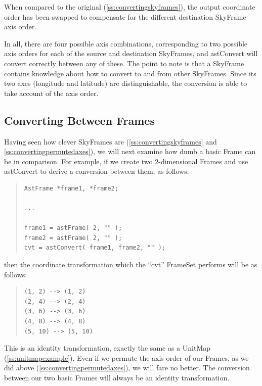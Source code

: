 \documentclass[twoside,11pt]{article}
\newcommand{\htmlref}[2]{#1}
\newcommand{\secref}[1]{\S\ref{#1}}
\renewcommand{\secref}[1]{\ref{#1}}
\begin{document}
When compared to the original (\secref{ss:convertingskyframes}), the
output coordinate order has been swapped to compensate for the
different destination SkyFrame axis order.

In all, there are four possible axis combinations, corresponding to two
possible axis orders for each of the source and destination SkyFrames,
and astConvert will convert correctly between any of these.
The point to note is that a SkyFrame contains knowledge about how to
convert to and from other SkyFrames. Since its two axes (longitude and
latitude) are distinguishable, the conversion is able to take account
of the axis order.

\subsection{\label{ss:convertingframes}Converting Between Frames}

Having seen how clever SkyFrames are (\secref{ss:convertingskyframes}
and \secref{ss:convertingpermutedaxes}), we will next examine how dumb
a basic \htmlref{Frame}{Frame} can be in comparison. For example, if we create two
2-dimensional Frames and use \htmlref{astConvert}{astConvert} to derive a conversion between
them, as follows:

\begin{quote}
\small
\begin{verbatim}
AstFrame *frame1, *frame2;

...

frame1 = astFrame( 2, "" );
frame2 = astFrame( 2, "" );
cvt = astConvert( frame1, frame2, "" );
\end{verbatim}
\normalsize
\end{quote}

then the coordinate transformation which the ``cvt'' \htmlref{FrameSet}{FrameSet} performs
will be as follows:

\begin{quote}
\begin{verbatim}
(1, 2) --> (1, 2)
(2, 4) --> (2, 4)
(3, 6) --> (3, 6)
(4, 8) --> (4, 8)
(5, 10) --> (5, 10)
\end{verbatim}
\end{quote}

This is an identity transformation, exactly the same as a \htmlref{UnitMap}{UnitMap}
(\secref{ss:unitmapexample}). Even if we permute the axis order of our
Frames, as we did above (\secref{ss:convertingpermutedaxes}), we will
fare no better. The conversion between our two basic Frames will
always be an identity transformation.
\end{document}
